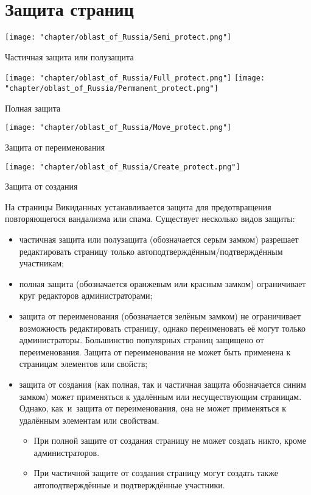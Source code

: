 \chapter{Защита страниц}
\label{protection}
%
\begin{marginfigure}[-2\baselineskip]
\centering\texttt{[image: "chapter/oblast\_of\_Russia/Semi\_protect.png"]}
\caption [Иконка. Частичная защита или полузащита.]{Частичная защита или полузащита}%
\end{marginfigure}

\begin{marginfigure}[0\baselineskip]
\centering\texttt{[image: "chapter/oblast\_of\_Russia/Full\_protect.png"]}
\texttt{[image: "chapter/oblast\_of\_Russia/Permanent\_protect.png"]}
\caption [Иконка. Полная защита.]{Полная защита}%
\end{marginfigure}

\begin{marginfigure}[0\baselineskip]
\centering\texttt{[image: "chapter/oblast\_of\_Russia/Move\_protect.png"]}
\caption [Иконка. Защита от переименования.]{Защита от переименования}%
\end{marginfigure}

\begin{marginfigure}[0\baselineskip]
\centering\texttt{[image: "chapter/oblast\_of\_Russia/Create\_protect.png"]}
\caption [Иконка. Защита от создания.]{Защита от создания}%
\end{marginfigure}

На страницы Викиданных устанавливается защита 
для предотвращения повторяющегося вандализма или спама. 
Существует несколько видов защиты:
\begin{itemize}
  \item частичная защита или полузащита (обозначается серым замком) разрешает редактировать страницу только автоподтверждённым/подтверждённым участникам;
  \item полная защита (обозначается оранжевым или красным замком) ограничивает круг редакторов администраторами;
  \item защита от переименования (обозначается зелёным замком) не ограничивает возможность редактировать страницу, однако переименовать её могут только администраторы. Большинство популярных страниц защищено от переименования. Защита от переименования не может быть применена к страницам элементов или свойств;
  \item защита от создания (как полная, так и частичная защита обозначается синим замком) может применяться к удалённым или несуществующим страницам. Однако, как~и~защита от переименования, она не может применяться к удалённым элементам или свойствам.
  \begin{itemize}
	\item При полной защите от создания страницу не может создать никто, кроме администраторов.
	\item При частичной защите от создания страницу могут создать также автоподтверждённые и подтверждённые участники.
  \end{itemize}
\end{itemize}




